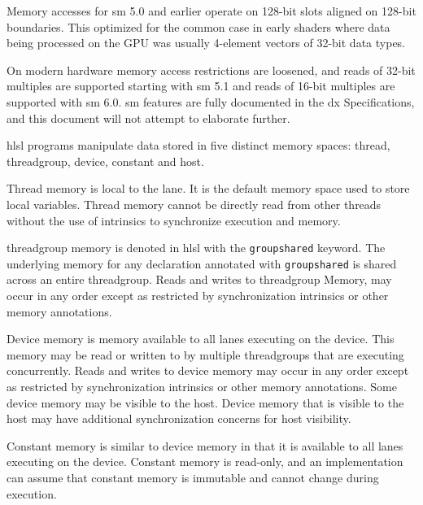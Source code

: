 \p Memory accesses for \gls{sm} 5.0 and earlier operate on 128-bit slots aligned
on 128-bit boundaries. This optimized for the common case in early shaders where
data being processed on the GPU was usually 4-element vectors of 32-bit data
types.

\p On modern hardware memory access restrictions are loosened, and reads of
32-bit multiples are supported starting with \gls{sm} 5.1 and reads of 16-bit
multiples are supported with \gls{sm} 6.0. \gls{sm} features are fully
documented in the \gls{dx} Specifications, and this document will not attempt to
elaborate further.


\p \acrshort{hlsl} programs manipulate data stored in five distinct memory
spaces: thread, threadgroup, device, constant and host.


\p Thread memory is local to the \gls{lane}. It is the default memory space used to
store local variables. Thread memory cannot be directly read from other threads
without the use of intrinsics to synchronize execution and memory.


\p \gls{threadgroup} memory is denoted in \acrshort{hlsl} with the
\texttt{groupshared} keyword. The underlying memory for any declaration
annotated with \texttt{groupshared} is shared across an entire
\gls{threadgroup}. Reads and writes to \gls{threadgroup} Memory, may occur in
any order except as restricted by synchronization intrinsics or other memory
annotations.


\p Device memory is memory available to all \gls{lane}s executing on the device.
This memory may be read or written to by multiple \gls{threadgroup}s that are
executing concurrently. Reads and writes to device memory may occur in any order
except as restricted by synchronization intrinsics or other memory annotations.
Some device memory may be visible to the host. Device memory that is visible to
the host may have additional synchronization concerns for host visibility.


\p Constant memory is similar to device memory in that it is available to all
\gls{lane}s executing on the device. Constant memory is read-only, and an
implementation can assume that constant memory is immutable and cannot change
during execution.
